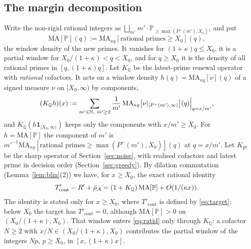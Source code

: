 \subsection{The margin decomposition}
Write the non-rigid rational integers as $\bigsqcup_{m'}m'\cdot\mathbb P_{\ge\max(P^+(m'),X_0)}$, and put
\[
  \mathrm{MA}[\mathbb P](q):=\mathrm{MA}_{\kappa q}[\text{rational primes}\ge X_0](q),
\]
the window density of the new primes. It vanishes for $(1+\kappa)q\le X_0$, it is a partial window for $X_0/(1+\kappa)<q<X_0$, and
for $q\ge X_0$ it is the density of all rational primes in $[q,(1+\kappa)q]$. Let $K_{\mathbb Q}$ be the latest-prime renewal operator
with \emph{rational} cofactors.
It acts on a window density $h(q)=\mathrm{MA}_{\kappa q}[\nu](q)$ of a signed measure $\nu$ on $[X_0,\infty)$ by components,
\[
  (K_{\mathbb Q}h)(x):=\sum_{m'\in\mathbb{N},\ m'\ge2}\frac1{m'}\,\mathrm{MA}_{\kappa q}\bigl[\nu|_{[P^+(m'),\infty)}\bigr](q)\Big|_{q=x/m'},
\]
and $K_{\mathbb Q}(h\mathbf 1_{[X_0,\infty)})$ keeps only the components with $x/m'\ge X_0$. For $h=\mathrm{MA}[\mathbb P]$ the component
of $m'$ is $m'^{-1}\mathrm{MA}_{\kappa q}[\text{rational primes}\ge\max(P^+(m'),X_0)](q)$ at $q=x/m'$. Let $K_{\mathrm{pt}}$ be the
sharp operator of Section~\ref{sec:noise}, with realised cofactors and latest prime in decision order (Section~\ref{sec:greedy}).
By dilation commutation (Lemma~\ref{lem:blin}(2)) we have, for $x\ge X_0$,
the exact rational identity
\begin{equation}\label{eq:ratid}
  T'_{\mathrm{cont}}-R'+\bar\rho_{\mathcal{A}}=(1+K_{\mathbb Q})\,\mathrm{MA}[\mathbb P]+O(1/(\kappa x)).
\end{equation}
The identity is stated only for $x\ge X_0$, where $T'_{\mathrm{cont}}$ is defined by \eqref{eq:target}; below $X_0$ the target
has $T'_{\mathrm{cont}}=0$, although $\mathrm{MA}[\mathbb P]>0$ on $(X_0/(1+\kappa),X_0)$. That window enters \eqref{eq:ratid} only through
$K_{\mathbb Q}$: a cofactor $N\ge2$ with $x/N\in(X_0/(1+\kappa),X_0)$ contributes the partial window of the integers $Np$, $p\ge X_0$, in
$[x,(1+\kappa)x]$.

